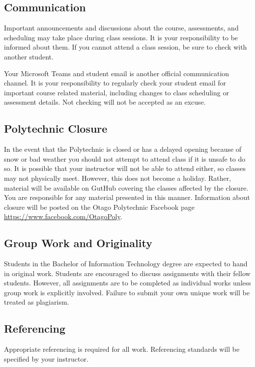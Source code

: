 \documentclass{article}
\begin{document}
\subsection*{Communication}
Important announcements and discussions about the course, assessments, and scheduling may take place during class sessions.  It is your responsibility to be informed about them.  If you cannot attend a class session, be sure to check with another student.

Your Microsoft Teams and student email is another official communication channel. It is your responsibility to regularly check your student email for important course related material, including changes to class scheduling or assessment details. Not checking will not be accepted as an excuse.



\subsection*{Polytechnic Closure}
In the event that the Polytechnic is closed or has a delayed opening because of snow or bad weather you should not attempt to attend class if it is unsafe to do so. It is possible that your instructor will not be able to attend either, so classes may not physically meet. However, this does not become a holiday. Rather, material will be available on GutHub covering the classes affected by the closure. You are responsible for any material presented in this manner. Information about closure will be posted on the Otago Polytechnic Facebook page \url{https://www.facebook.com/OtagoPoly}.

\subsection*{Group Work and Originality}
Students in the Bachelor of Information Technology degree are expected to hand in original work.  
Students are encouraged to discuss assignments with their fellow students.  However, all assignments 
are to be completed as individual works unless group work is explicitly involved.
Failure to submit your own unique work will be treated as plagiarism.

\subsection*{Referencing}
Appropriate referencing is required for all work.  Referencing standards will be specified by your instructor.
\end{document}
